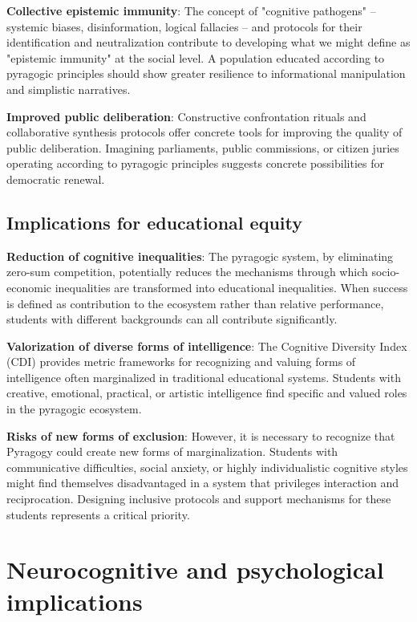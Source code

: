 \textbf{Collective epistemic immunity}:
The concept of "cognitive pathogens" -- systemic biases, disinformation, logical fallacies -- and protocols for their identification and neutralization contribute to developing what we might define as "epistemic immunity" at the social level. A population educated according to pyragogic principles should show greater resilience to informational manipulation and simplistic narratives.

\textbf{Improved public deliberation}:
Constructive confrontation rituals and collaborative synthesis protocols offer concrete tools for improving the quality of public deliberation. Imagining parliaments, public commissions, or citizen juries operating according to pyragogic principles suggests concrete possibilities for democratic renewal.

\subsection{Implications for educational equity}

\textbf{Reduction of cognitive inequalities}:
The pyragogic system, by eliminating zero-sum competition, potentially reduces the mechanisms through which socio-economic inequalities are transformed into educational inequalities. When success is defined as contribution to the ecosystem rather than relative performance, students with different backgrounds can all contribute significantly.

\textbf{Valorization of diverse forms of intelligence}:
The Cognitive Diversity Index (CDI) provides metric frameworks for recognizing and valuing forms of intelligence often marginalized in traditional educational systems. Students with creative, emotional, practical, or artistic intelligence find specific and valued roles in the pyragogic ecosystem.

\textbf{Risks of new forms of exclusion}:
However, it is necessary to recognize that Pyragogy could create new forms of marginalization. Students with communicative difficulties, social anxiety, or highly individualistic cognitive styles might find themselves disadvantaged in a system that privileges interaction and reciprocation. Designing inclusive protocols and support mechanisms for these students represents a critical priority.

\section{Neurocognitive and psychological implications}
